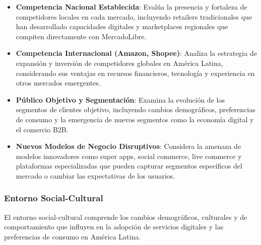 \begin{itemize}
\item \textbf{Competencia Nacional Establecida}: Evalúa la presencia y fortaleza de competidores locales en cada mercado, incluyendo retailers tradicionales que han desarrollado capacidades digitales y marketplaces regionales que compiten directamente con MercadoLibre.

\item \textbf{Competencia Internacional (Amazon, Shopee)}: Analiza la estrategia de expansión y inversión de competidores globales en América Latina, considerando sus ventajas en recursos financieros, tecnología y experiencia en otros mercados emergentes.

\item \textbf{Público Objetivo y Segmentación}: Examina la evolución de los segmentos de clientes objetivo, incluyendo cambios demográficos, preferencias de consumo y la emergencia de nuevos segmentos como la economía digital y el comercio B2B.

\item \textbf{Nuevos Modelos de Negocio Disruptivos}: Considera la amenaza de modelos innovadores como super apps, social commerce, live commerce y plataformas especializadas que pueden capturar segmentos específicos del mercado o cambiar las expectativas de los usuarios.
\end{itemize}

\subsubsection{Entorno Social-Cultural}

El entorno social-cultural comprende los cambios demográficos, culturales y de comportamiento que influyen en la adopción de servicios digitales y las preferencias de consumo en América Latina.

